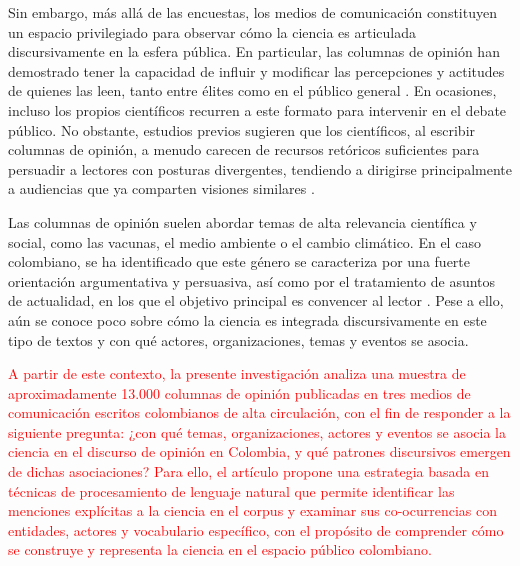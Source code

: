 \documentclass[11pt,a4paper]{article}
\begin{document}
	Sin embargo, más allá de las encuestas, los medios de comunicación constituyen un espacio privilegiado para observar cómo la ciencia es articulada discursivamente en la esfera pública. En particular, las columnas de opinión han demostrado tener la capacidad de influir y modificar las percepciones y actitudes de quienes las leen, tanto entre élites como en el público general \cite{Coppock2018}. En ocasiones, incluso los propios científicos recurren a este formato para intervenir en el debate público. No obstante, estudios previos sugieren que los científicos, al escribir columnas de opinión, a menudo carecen de recursos retóricos suficientes para persuadir a lectores con posturas divergentes, tendiendo a dirigirse principalmente a audiencias que ya comparten visiones similares \cite{Syfert2025}.
	
	Las columnas de opinión suelen abordar temas de alta relevancia científica y social, como las vacunas, el medio ambiente o el cambio climático. En el caso colombiano, se ha identificado que este género se caracteriza por una fuerte orientación argumentativa y persuasiva, así como por el tratamiento de asuntos de actualidad, en los que el objetivo principal es convencer al lector \cite{CaroLopera2020}. Pese a ello, aún se conoce poco sobre cómo la ciencia es integrada discursivamente en este tipo de textos y con qué actores, organizaciones, temas y eventos se asocia.
	
%	
	\textcolor{red}{A partir de este contexto, la presente investigación analiza una muestra de aproximadamente 13.000 columnas de opinión publicadas en tres medios de comunicación escritos colombianos de alta circulación, con el fin de responder a la siguiente pregunta: ¿con qué temas, organizaciones, actores y eventos se asocia la ciencia en el discurso de opinión en Colombia, y qué patrones discursivos emergen de dichas asociaciones? Para ello, el artículo propone una estrategia basada en técnicas de procesamiento de lenguaje natural que permite identificar las menciones explícitas a la ciencia en el corpus y examinar sus co-ocurrencias con entidades, actores y vocabulario específico, con el propósito de comprender cómo se construye y representa la ciencia en el espacio público colombiano.}
	
\end{document}
